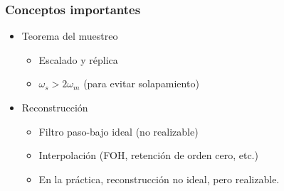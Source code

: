 \documentclass[handout]{beamer}
\numberwithin{section}{part}
\begin{document}
  \begin{frame}\frametitle{Conceptos importantes}
    \begin{itemize}
      \item \alert{Teorema del muestreo}
      \begin{itemize}
        \item Escalado y réplica
        \item $\omega_s>2\omega_m$ (para evitar solapamiento)
      \end{itemize}
      \item \alert{Reconstrucción}
      \begin{itemize}
        \item Filtro paso-bajo ideal (no realizable)
        \item Interpolación (FOH, retención de orden cero, etc.)
        \item En la práctica, reconstrucción no ideal, pero realizable.
      \end{itemize}
    \end{itemize}
  \end{frame}
\end{document}
